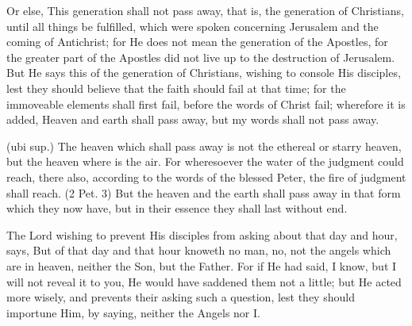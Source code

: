 Or else, This generation shall not pass away, that is, the generation of Christians, until all things be fulfilled, which were spoken concerning Jerusalem and the coming of Antichrist; for He does not mean the generation of the Apostles, for the greater part of the Apostles did not live up to the destruction of Jerusalem. But He says this of the generation of Christians, wishing to console His disciples, lest they should believe that the faith should fail at that time; for the immoveable elements shall first fail, before the words of Christ fail; wherefore it is added, Heaven and earth shall pass away, but my words shall not pass away.

 (ubi sup.) The heaven which shall pass away is not the ethereal or starry heaven, but the heaven where is the air. For wheresoever the water of the judgment could reach, there also, according to the words of the blessed Peter, the fire of judgment shall reach. (2 Pet. 3) But the heaven and the earth shall pass away in that form which they now have, but in their essence they shall last without end.

 

 The Lord wishing to prevent His disciples from asking about that day and hour, says, But of that day and that hour knoweth no man, no, not the angels which are in heaven, neither the Son, but the Father. For if He had said, I know, but I will not reveal it to you, He would have saddened them not a little; but He acted more wisely, and prevents their asking such a question, lest they should importune Him, by saying, neither the Angels nor I.

